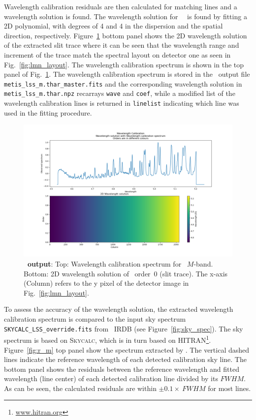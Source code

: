 Wavelength calibration residuals are then calculated for matching lines and a wavelength solution  is found. The wavelength solution for \met~\lss~is found by fitting a 2D polynomial, with degrees of 4 and 4 in the dispersion and the spatial direction, respectively. Figure~\ref{fig:fig12} bottom panel shows the 2D wavelength solution of the extracted slit trace where it can be seen that the wavelength range and increment of the trace match the spectral layout on detector one as seen in Fig.~\ref{fig:lmn_layout}.  The wavelength calibration spectrum is shown in the top panel of Fig.~\ref{fig:fig12}. The wavelength calibration spectrum is stored in the \pyred~output file \texttt{metis\_lss\_m.thar\_master.fits} and the corresponding wavelength solution in \texttt{metis\_lss\_m.thar.npz} recarrays \texttt{wave} and \texttt{coef}, while a modified list of the wavelength calibration lines is returned  in \texttt{linelist} indicating which line was used in the fitting procedure. 

\begin{figure}[!ht]
  \centering
  \includegraphics[width=\textwidth]{figures/LSS_CrtAlg_files/Figure_15.png}
  \caption{\textbf{\pyred~output}: Top: Wavelength calibration spectrum for  \lss~$M$-band. Bottom: 2D wavelength solution of \pyred~order~0 (\lss slit trace). The x-axis (Column) refers to the y pixel of the detector image in Fig.~\ref{fig:lmn_layout}. }
  \label{fig:fig12}
\end{figure}




To assess the accuracy of the wavelength solution, the extracted wavelength calibration spectrum is compared to the input sky spectrum \texttt{SKYCALC\_LSS\_override.fits} from \met~IRDB (see Figure~\ref{fig:sky_spec}). The sky spectrum is based on \textsc{Skycalc}, which is in turn based on \textsc{HITRAN}\footnote{\url{www.hitran.org}}. Figure~\ref{fig:r_m} top panel show the spectrum extracted by \pyred. The vertical dashed lines indicate the reference wavelength of each detected calibration sky line. The bottom panel shows the residuals between the reference wavelength and fitted wavelength (line center) of each detected calibration line divided by its $FWHM$. As can be seen, the calculated residuals are within $\pm 0.1 \times~FWHM$ for most lines.


